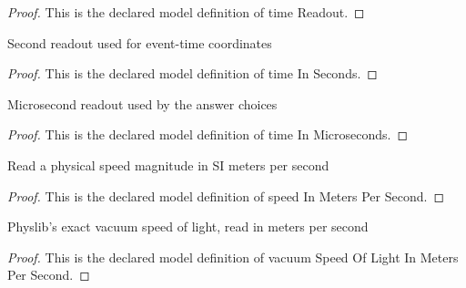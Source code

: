 \begin{proof}
  This is the declared model definition of time Readout.
\end{proof}
\begin{definition}
  \label{def:physics:phyx-mini-0552:phyxminiproblems-problemphyxmini0552-timeinseconds}
  Second readout used for event-time coordinates
\end{definition}
\begin{proof}
  This is the declared model definition of time In Seconds.
\end{proof}
\begin{definition}
  \label{def:physics:phyx-mini-0552:phyxminiproblems-problemphyxmini0552-timeinmicroseconds}
  Microsecond readout used by the answer choices
\end{definition}
\begin{proof}
  This is the declared model definition of time In Microseconds.
\end{proof}
\begin{definition}
  \label{def:physics:phyx-mini-0552:phyxminiproblems-problemphyxmini0552-speedinmeterspersecond}
  Read a physical speed magnitude in SI meters per second
\end{definition}
\begin{proof}
  This is the declared model definition of speed In Meters Per Second.
\end{proof}
\begin{definition}
  \label{def:physics:phyx-mini-0552:phyxminiproblems-problemphyxmini0552-vacuumspeedoflightinmeterspersecond}
  Physlib's exact vacuum speed of light, read in meters per second
\end{definition}
\begin{proof}
  This is the declared model definition of vacuum Speed Of Light In Meters Per Second.
\end{proof}
